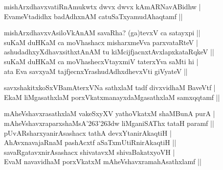 \begin{entry}
\begin{shl}
mishArxdhavxvatiRnAmukwtx dwvx dwvx kAmARNavABidhw |\\
EvameVtadidhx badAdhxnAM catuSaTxyamudAhaqtamf ||
\end{shl}
\begin{shl}
mishArxdhavxvAsiloVkAnAM savaRha? (ga)tevxV ca satayxpi ||\\
suKaM duHKaM ca moVhashacx misharxmeVva parxvataRteV |\\
ashudadhxyXdhavxsithxtAnAM tu kiMcijfjacnxtAvxlapxkataRqkeV ||\\
suKaM duHKaM ca moVhashecxVtayxmiV taterxYva saMti hi |\\
ata Eva savxyaM tajfjecnxYrashudAdhxdhevxVti giVyateV ||
\end{shl}
\medskip
{}
\smallskip
\begin{shl}
savxshakitxkoSxVBamAterxVNa sathxlaM tadf divxvidhaM BaveVtf |\\
EkaM liMgasathxlaM porxVkatxmanayxdaMgasathxlaM samxqqtamf ||
\end{shl}
\medskip
{}
\smallskip
\begin{shl}
mAheVshavxrasathxlaM vakeSxyXV yathoVkatxM shaMBunA purA |\\
mAheVshavxraparxshaMsA{\char'263\char'263}dw liMganiSAThx tataH paramf ||\\
pUvARsharxyanirAsashacx tathA devxYtanirAkaqtiH |\\
AhAvxnavajaRnaM pashAcxtf aSaTxmUtiRnirAkaqtiH ||\\
savaRgatavxnirAsashacx shivatavxM shivaBakatxyoVH |\\
EvaM navavidhaM porxVkatxM mAheVshavxramahAsathxlamf ||
\end{shl}
\medskip
{}
\smallskip
\begin{shl}

\end{shl}
\end{entry}
